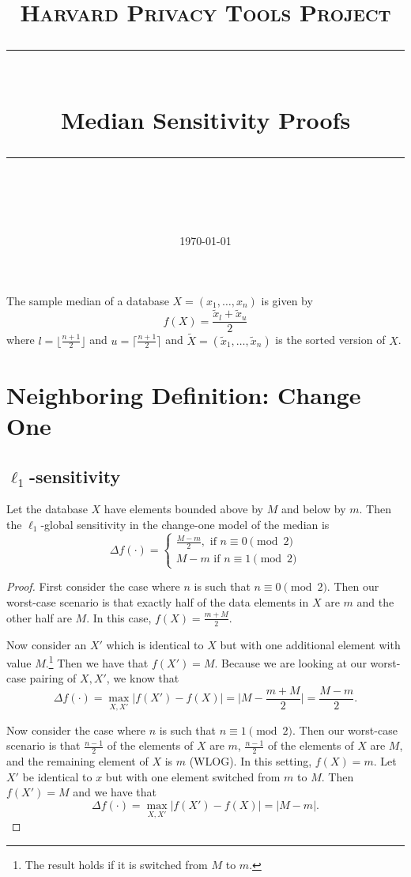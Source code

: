 \documentclass[11pt]{scrartcl} %
\title{
	\normalfont\normalsize
	\textsc{Harvard Privacy Tools Project}\\ %
	\vspace{25pt} %
	\rule{\linewidth}{0.5pt}\\ %
	\vspace{20pt} %
	{\huge Median Sensitivity Proofs}\\ %
	\vspace{12pt} %
	\rule{\linewidth}{2pt}\\ %
	\vspace{12pt} %
}
\date{\normalsize\today} %
\begin{document}
\maketitle

\begin{definition}
The sample median of a database $X = (x_1, \hdots, x_n)$ is given by
\[ f(X) = \frac{\tilde{x}_l + \tilde{x}_u}{2} \]
where $l = \lfloor \frac{n+1}{2} \rfloor$ and $u = \lceil \frac{n+1}{2} \rceil$ and
$\tilde{X} = (\tilde{x}_1, \hdots, \tilde{x}_n)$ is the sorted version of $X$.
\end{definition}

\section{Neighboring Definition: Change One}

\subsection{$\ell_1$-sensitivity}
\begin{theorem}
	Let the database $X$ have elements bounded above by $M$ and below by $m$.
	Then the $\ell_1$-global sensitivity in the change-one model of the median is
	\[
		\Delta f(\cdot) =
			\begin{cases}
				\frac{M - m}{2}, \text{ if } n \equiv 0 \pmod{2} \\
				M-m \text{ if } n \equiv 1 \pmod{2}
			\end{cases}
	\]
\end{theorem}

\begin{proof}
	First consider the case where $n$ is such that $n \equiv 0 \pmod{2}$. Then our worst-case scenario is that exactly half of the data elements in $X$ are $m$ and the other half are $M$. In this case,
	$f(X) = \frac{m + M}{2}$. \newline

	Now consider an $X'$ which is identical to $X$ but with one additional element with value $M$.\footnote{The result holds if it is switched from $M$ to $m$.}
	Then we have that $f(X') = M$. Because we are looking at our worst-case pairing of $X,X'$,
	we know that
	\[ \Delta f(\cdot) = \max_{X,X'} |f(X') - f(X)| = \big\vert M - \frac{m+M}{2} \big\vert = \frac{M-m}{2}. \]

	Now consider the case where $n$ is such that $n \equiv 1 \pmod{2}$.
	Then our worst-case scenario is that $\frac{n-1}{2}$ of the elements of $X$ are $m$,
	$\frac{n-1}{2}$ of the elements of $X$ are $M$, and the remaining element of $X$ is $m$ (WLOG).
	In this setting, $f(X) = m$.
	Let $X'$ be identical to $x$ but with one element switched from $m$ to $M$.
	Then $f(X') = M$ and we have that
	\[ \Delta f(\cdot) = \max_{X,X'} |f(X') - f(X)| = |M - m|. \]
\end{proof}
\end{document}
